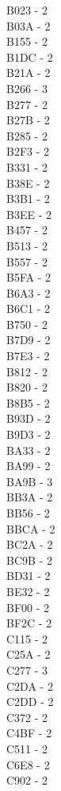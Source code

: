 \documentclass[10pt,letterpaper]{article}
\begin{document}
B023 -  2\\
B03A -  2\\
B155 -  2\\
B1DC -  2\\
B21A -  2\\
B266 -  3\\
B277 -  2\\
B27B -  2\\
B285 -  2\\
B2F3 -  2\\
B331 -  2\\
B38E -  2\\
B3B1 -  2\\
B3EE -  2\\
B457 -  2\\
B513 -  2\\
B557 -  2\\
B5FA -  2\\
B6A3 -  2\\
B6C1 -  2\\
B750 -  2\\
B7D9 -  2\\
B7E3 -  2\\
B812 -  2\\
B820 -  2\\
B8B5 -  2\\
B93D -  2\\
B9D3 -  2\\
BA33 -  2\\
BA99 -  2\\
BA9B -  3\\
BB3A -  2\\
BB56 -  2\\
BBCA -  2\\
BC2A -  2\\
BC9B -  2\\
BD31 -  2\\
BE32 -  2\\
BF00 -  2\\
BF2C -  2\\
C115 -  2\\
C25A -  2\\
C277 -  3\\
C2DA -  2\\
C2DD -  2\\
C372 -  2\\
C4BF -  2\\
C511 -  2\\
C6E8 -  2\\
C902 -  2\\
\end{document}
